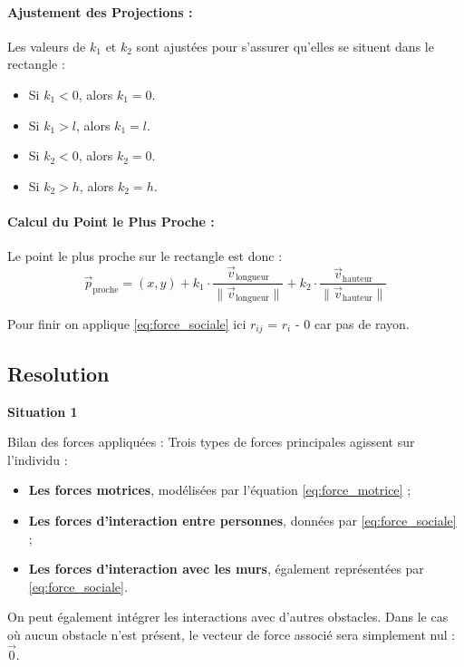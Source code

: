 \documentclass[a4paper,12pt]{article}
\begin{document}
\paragraph{Ajustement des Projections :}

Les valeurs de $k_1$ et $k_2$ sont ajustées pour s'assurer qu'elles se situent dans le rectangle :
\begin{itemize}
    \item Si $k_1 < 0$, alors $k_1 = 0$.
    \item Si $k_1 > l$, alors $k_1 = l$.
    \item Si $k_2 < 0$, alors $k_2 = 0$.
    \item Si $k_2 > h$, alors $k_2 = h$.
\end{itemize}

\paragraph{Calcul du Point le Plus Proche :}

Le point le plus proche sur le rectangle est donc :
\[
\vec{p}_{\text{proche}} = (x, y) + k_1 \cdot \frac{\vec{v}_{\text{longueur}}}{\|\vec{v}_{\text{longueur}}\|} + k_2 \cdot \frac{\vec{v}_{\text{hauteur}}}{\|\vec{v}_{\text{hauteur}}\|}
\]

Pour finir on applique \eqref{eq:force_sociale} ici $r_{ij}$ = $r_i$ - 0 car pas de rayon.

\subsection{Resolution}

\textbf{Situation 1}

Bilan des forces appliquées :
Trois types de forces principales agissent sur l’individu :
\begin{itemize}
\item \textbf{Les forces motrices}, modélisées par l’équation \eqref{eq:force_motrice} ;
\item \textbf{Les forces d’interaction entre personnes}, données par \eqref{eq:force_sociale} ;
\item \textbf{Les forces d’interaction avec les murs}, également représentées par \eqref{eq:force_sociale}.
\end{itemize}

On peut également intégrer les interactions avec d’autres obstacles. Dans le cas où aucun obstacle n’est présent, le vecteur de force associé sera simplement nul : $\vec{0}$.
\end{document}
